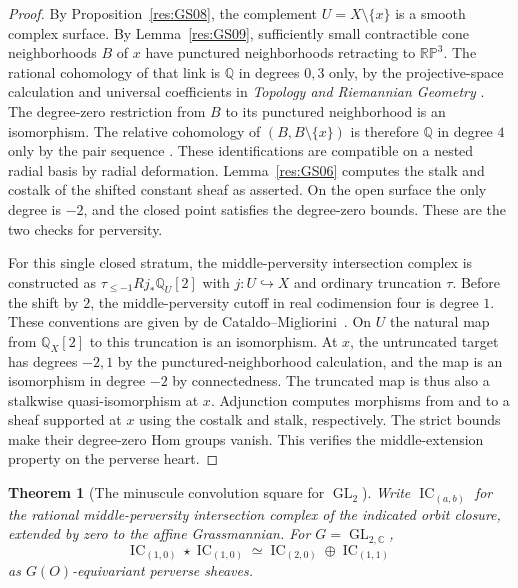 \documentclass[11pt,oneside,openany]{book}
\newtheorem{theorem}{Theorem}[chapter]
\theoremstyle{definition}
\theoremstyle{remark}
\begin{document}
\begin{proof}
By Proposition~\ref{res:GS08}, the complement \(U=X\setminus\{x\}\)
is a smooth complex surface. By Lemma~\ref{res:GS09}, sufficiently
small contractible cone neighborhoods \(B\) of \(x\) have
punctured neighborhoods retracting to \(\mathbb{RP}^3\).
The rational cohomology of that link is \(\mathbb Q\) in
degrees \(0,3\) only, by the projective-space calculation and
universal coefficients in \emph{Topology and Riemannian Geometry}
\cite[Proposition 4.3 and Theorem 4.13,
PDF pp.~24 and 29]{mg-topriem}. The degree-zero restriction
from \(B\) to its punctured neighborhood is an isomorphism.
The relative cohomology of \((B,B\setminus\{x\})\) is therefore
\(\mathbb Q\) in degree \(4\) only by the pair sequence
\cite[Proposition 4.8, PDF p.~26]{mg-topriem}.
These identifications are compatible on a nested radial basis
by radial deformation. Lemma~\ref{res:GS06} computes the
stalk and costalk of the shifted constant sheaf as asserted.
On the open surface the only degree is \(-2\), and the
closed point satisfies the degree-zero bounds. These are
the two checks for perversity.

For this single closed stratum, the middle-perversity
intersection complex is constructed as
\(\tau_{\leq-1}Rj_*\mathbb Q_U[2]\) with \(j:U\hookrightarrow X\)
and ordinary truncation \(\tau\).
Before the shift by \(2\), the middle-perversity cutoff in real
codimension four is degree \(1\). These conventions are given by
de Cataldo--Migliorini~\cite[Sections 2.1 and 2.7]{decataldomigliorini}.
On \(U\) the natural map from \(\mathbb Q_X[2]\) to this
truncation is an isomorphism. At \(x\), the untruncated
target has degrees \(-2,1\) by the punctured-neighborhood
calculation, and the map is an isomorphism in degree \(-2\)
by connectedness. The truncated map is thus also a
stalkwise quasi-isomorphism at \(x\).
Adjunction computes morphisms from and to a sheaf supported
at \(x\) using the costalk and stalk, respectively. The strict
bounds make their degree-zero Hom groups vanish. This verifies
the middle-extension property on the perverse heart.
\end{proof}

\begin{theorem}[The minuscule convolution square for \(\operatorname{GL}_2\)]
\label{res:GS11}
Write \(\operatorname{IC}_{(a,b)}\) for the
rational middle-perversity intersection complex of the
indicated orbit closure, extended by zero to the affine
Grassmannian. For \(G=\operatorname{GL}_{2,\mathbb C}\),
\[
 \operatorname{IC}_{(1,0)}\star\operatorname{IC}_{(1,0)}
       \simeq \operatorname{IC}_{(2,0)}
                   \oplus\operatorname{IC}_{(1,1)}
\]
as \(G(O)\)-equivariant perverse sheaves.
\end{theorem}
\end{document}
